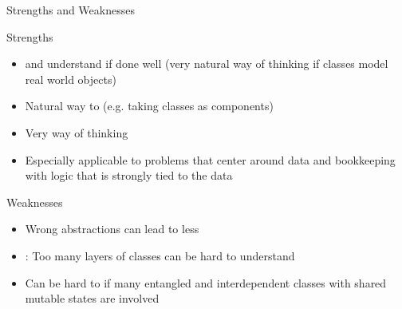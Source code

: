 \begin{frame}{Strengths and Weaknesses}

\begin{block}{Strengths}
	\only<+->{}
	\begin{itemize}
		\item<+->  and understand if done well (very natural way of thinking if classes model real world objects)
		\item<+-> Natural way to  (e.g. taking classes as components)
		\item<+-> Very  way of thinking
		\item<+-> Especially applicable to problems that center around data and bookkeeping with logic that is strongly tied to the data
	\end{itemize}
\end{block}
\begin{block}{Weaknesses}
\begin{itemize}
	\item<+-> Wrong abstractions can lead to less 
	\item<+-> : Too many layers of classes can be hard to understand
	\item<+-> Can be hard to  if many entangled and interdependent classes with shared mutable states are involved 
\end{itemize}
\end{block}
\end{frame}
